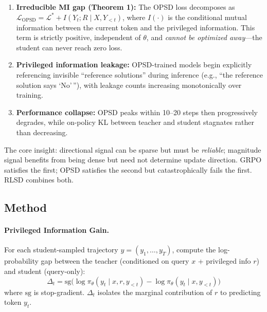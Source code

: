 \documentclass[11pt]{article}
\begin{document}
\begin{enumerate}
    \item \textbf{Irreducible MI gap (Theorem 1):} The OPSD loss decomposes as $\mathcal{L}_{\mathrm{OPSD}} = \mathcal{L}^* + I(Y_t; R \mid X, Y_{<t})$, where $I(\cdot)$ is the conditional mutual information between the current token and the privileged information. This term is strictly positive, independent of $\theta$, and \textit{cannot be optimized away}---the student can never reach zero loss.

    \item \textbf{Privileged information leakage:} OPSD-trained models begin explicitly referencing invisible ``reference solutions'' during inference (e.g., ``the reference solution says `No'\,''), with leakage counts increasing monotonically over training.

    \item \textbf{Performance collapse:} OPSD peaks within 10--20 steps then progressively degrades, while on-policy KL between teacher and student stagnates rather than decreasing.
\end{enumerate}

The core insight: directional signal can be sparse but must be \textit{reliable}; magnitude signal benefits from being dense but need not determine update direction. GRPO satisfies the first; OPSD satisfies the second but catastrophically fails the first. RLSD combines both.

\subsection{Method}

\paragraph{Privileged Information Gain.}
For each student-sampled trajectory $y = (y_1, \ldots, y_T)$, compute the log-probability gap between the teacher (conditioned on query $x$ + privileged info $r$) and student (query-only):
\begin{equation}
    \Delta_t = \mathrm{sg}\!\big(\log \pi_\theta(y_t \mid x, r, y_{<t}) - \log \pi_\theta(y_t \mid x, y_{<t})\big)
\end{equation}
where $\mathrm{sg}$ is stop-gradient. $\Delta_t$ isolates the marginal contribution of $r$ to predicting token $y_t$.
\end{document}
